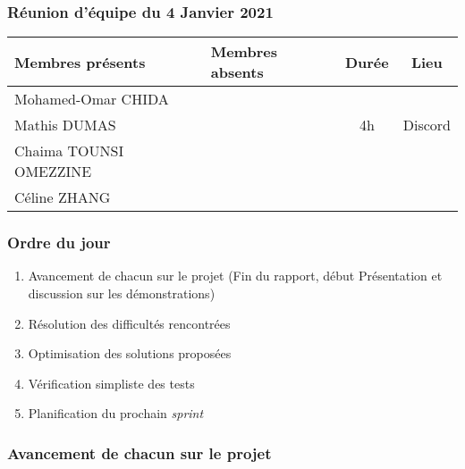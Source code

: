 


% 
\subsubsection*{\large{Réunion d'équipe du 4 Janvier 2021}}
\begin{center}
\begin{tabular}{| l | l || c | c |}
    \hline
    Membres présents & Membres absents & Durée & Lieu \\
    \hline
    Mohamed-Omar CHIDA & & & \\ Mathis DUMAS & & 4h & Discord \\ Chaima TOUNSI OMEZZINE & & & \\ Céline ZHANG & & & \\
    \hline
\end{tabular}
\end{center}

\subsubsection*{Ordre du jour}
\begin{enumerate}
    \item Avancement de chacun sur le projet (Fin du rapport, début Présentation et discussion sur les démonstrations)
    \item Résolution des difficultés rencontrées
    \item Optimisation des solutions proposées
    \item Vérification simpliste des tests
    \item Planification du prochain \textsl{sprint}
\end{enumerate}

\subsubsection*{Avancement de chacun sur le projet}
